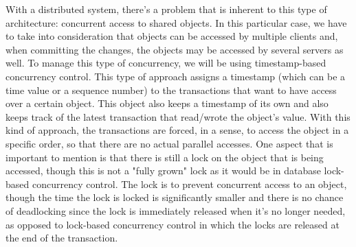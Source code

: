 \documentclass[times, 10pt,twocolumn]{article}
\begin{document}

With a distributed system, there's a problem that is inherent to this type of architecture: concurrent access to shared objects. In this particular case, we have to take into consideration that objects can be accessed by multiple clients and, when committing the changes, the objects may be accessed by several servers as well.
To manage this type of concurrency, we will be using timestamp-based concurrency control. This type of approach assigns a timestamp (which can be a time value or a sequence number) to the transactions that want to have access over a certain object. This object also keeps a timestamp of its own and also keeps track of the latest transaction that read/wrote the object's value. With this kind of approach, the transactions are forced, in a sense, to access the object in a specific order, so that there are no actual parallel accesses.
One aspect that is important to mention is that there is still a lock on the object that is being accessed, though this is not a "fully grown" lock as it would be in database lock-based concurrency control. The lock is to prevent concurrent access to an object, though the time the lock is locked is significantly smaller and there is no chance of deadlocking since the lock is immediately released when it's no longer needed, as opposed to lock-based concurrency control in which the locks are released at the end of the transaction.

\end{document}
